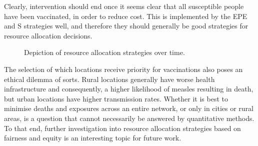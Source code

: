 Clearly, intervention should end once it seems clear that all susceptible people have been vaccinated, in order to reduce cost. This is implemented by the EPE and S strategies well, and therefore they should generally be good strategies for resource allocation decisions.

\begin{figure}[ht!]{\textwidth}
    \centering
     \vspace{4}
    \caption{Depiction of resource allocation strategies over time.}
    \end{figure}

The selection of which locations receive priority for vaccinations also poses an ethical dilemma of sorts. Rural locations generally have worse health infrastructure and consequently, a higher likelihood of measles resulting in death, but urban locations have higher transmission rates. Whether it is best to minimise deaths and exposures across an entire network, or only in cities or rural areas, is a question that cannot necessarily be answered by quantitative methods. To that end, further investigation into resource allocation strategies based on fairness and equity is an interesting topic for future work.

